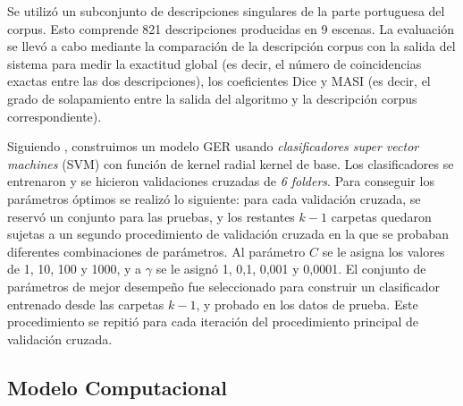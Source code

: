Se utiliz\'o un subconjunto de descripciones singulares de la parte portuguesa del corpus. Esto comprende 821 descripciones producidas en 9 escenas. La evaluaci\'on se llev\'o a cabo mediante la comparaci\'on de la descripci\'on corpus con la salida del sistema para medir la exactitud global (es decir, el n\'umero de coincidencias exactas entre las dos descripciones), los coeficientes Dice \cite{dice} y MASI \cite{masi} (es decir, el grado de solapamiento entre la salida del algoritmo y la descripci\'on corpus correspondiente).

Siguiendo \cite{thiago-svm}, construimos un modelo GER usando {\it clasificadores super vector machines} (SVM) con funci\'on de kernel radial kernel de base. Los clasificadores se entrenaron y se hicieron validaciones cruzadas de {\it 6 folders}. Para conseguir los par\'ametros \'optimos se realiz\'o lo siguiente: para cada validaci\'on cruzada, se reserv\'o un conjunto para las pruebas, y los restantes $k-1$ carpetas quedaron sujetas a un segundo procedimiento de validaci\'on cruzada en la que se probaban diferentes combinaciones de par\'ametros. Al par\'ametro $C$ se le asigna los valores de 1, 10, 100 y 1000, y a $\gamma$ se le asign\'o 1, 0,1, 0,001 y 0,0001. El conjunto de par\'ametros de mejor desempe\~no fue seleccionado para construir un clasificador entrenado desde las carpetas $k-1$, y probado en los datos de prueba. Este procedimiento se repiti\'o para cada iteraci\'on del procedimiento principal de validaci\'on cruzada.
\subsection{Modelo Computacional }



